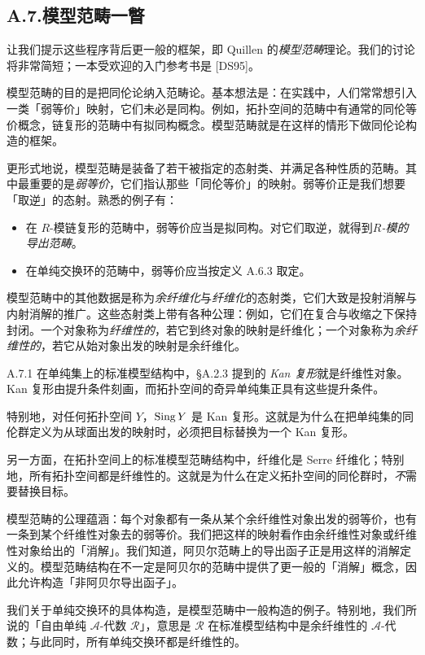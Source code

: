 \subsection*{A.7.\quad 模型范畴一瞥}

让我们提示这些程序背后更一般的框架，即 Quillen 的\emph{模型范畴}理论。我们的讨论将非常简短；一本受欢迎的入门参考书是 [DS95]。

模型范畴的目的是把同伦论纳入范畴论。基本想法是：在实践中，人们常常想引入一类「弱等价」映射，它们未必是同构。例如，拓扑空间的范畴中有通常的同伦等价概念，链复形的范畴中有拟同构概念。模型范畴就是在这样的情形下做同伦论构造的框架。

更形式地说，模型范畴是装备了若干被指定的态射类、并满足各种性质的范畴。其中最重要的是\emph{弱等价}，它们指认那些「同伦等价」的映射。弱等价正是我们想要「取逆」的态射。熟悉的例子有：
\begin{itemize}
\item 在 $R$-模链复形的范畴中，弱等价应当是拟同构。对它们取逆，就得到\emph{$R$-模的导出范畴}。
\item 在单纯交换环的范畴中，弱等价应当按定义 A.6.3 取定。
\end{itemize}
模型范畴中的其他数据是称为\emph{余纤维化}与\emph{纤维化}的态射类，它们大致是投射消解与内射消解的推广。这些态射类上带有各种公理：例如，它们在复合与收缩之下保持封闭。一个对象称为\emph{纤维性的}，若它到终对象的映射是纤维化；一个对象称为\emph{余纤维性的}，若它从始对象出发的映射是余纤维化。

\begin{exam}{A.7.1}\label{thm:a6-07-12}
在单纯集上的标准模型结构中，§A.2.3 提到的 \emph{Kan 复形}就是纤维性对象。Kan 复形由提升条件刻画，而拓扑空间的奇异单纯集正具有这些提升条件。
\end{exam}

特别地，对任何拓扑空间 $Y$，$\operatorname{Sing} Y$ 是 Kan 复形。这就是为什么在把单纯集的同伦群定义为从球面出发的映射时，必须把目标替换为一个 Kan 复形。

另一方面，在拓扑空间上的标准模型范畴结构中，纤维化是 Serre 纤维化；特别地，所有拓扑空间都是纤维性的。这就是为什么在定义拓扑空间的同伦群时，\emph{不}需要替换目标。

模型范畴的公理蕴涵：每个对象都有一条从某个余纤维性对象出发的弱等价，也有一条到某个纤维性对象去的弱等价。我们把这样的映射看作由余纤维性对象或纤维性对象给出的「消解」。我们知道，阿贝尔范畴上的导出函子正是用这样的消解定义的。模型范畴结构在不一定是阿贝尔的范畴中提供了更一般的「消解」概念，因此允许构造「非阿贝尔导出函子」。

我们关于单纯交换环的具体构造，是模型范畴中一般构造的例子。特别地，我们所说的「自由单纯 $\mathcal A$-代数 $\mathcal R$」，意思是 $\mathcal R$ 在标准模型结构中是余纤维性的 $\mathcal A$-代数；与此同时，所有单纯交换环都是纤维性的。

